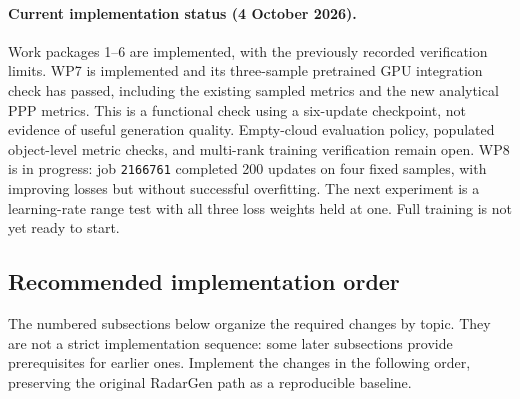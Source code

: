 \documentclass[11pt,a4paper]{article}
\begin{document}
\paragraph{Current implementation status (4 October 2026).}
Work packages 1--6 are implemented, with the previously recorded
verification limits. WP7 is implemented and its three-sample pretrained
GPU integration check has passed, including the existing sampled metrics
and the new analytical PPP metrics. This is a functional check using a
six-update checkpoint, not evidence of useful generation quality.
Empty-cloud evaluation policy, populated object-level metric checks,
and multi-rank training verification remain open. WP8 is in progress:
job \texttt{2166761} completed 200 updates on four fixed samples, with
improving losses but without successful overfitting. The next experiment
is a learning-rate range test with all three loss weights held at one.
Full training is not yet ready to start.

\subsection*{Recommended implementation order}

The numbered subsections below organize the required changes by topic.
They are not a strict implementation sequence: some later subsections
provide prerequisites for earlier ones. Implement the changes in the
following order, preserving the original RadarGen path as a reproducible
baseline.
\end{document}
